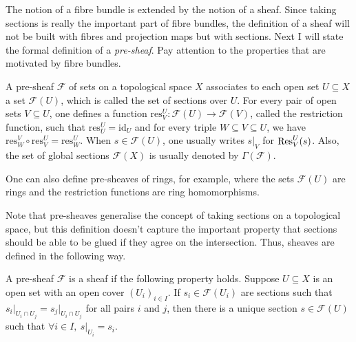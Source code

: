 The notion of a fibre bundle is extended by the notion of a sheaf.
Since taking sections is really the important part of fibre bundles, the
definition of a sheaf will not be built with fibres and projection maps
but with sections. Next I will state the formal definition of a
\emph{pre-sheaf}. Pay attention to the properties that are motivated by
fibre bundles.
\begin{defin}
  A pre-sheaf $\mathscr{F}$ of sets on a topological space $X$ associates
  to each open set $U\subseteq X$ a set $\mathscr{F}(U)$, which is called
  the set of sections over $U$. For every pair of open sets $V\subseteq U$,
  one defines a function $\text{res}_{V}^{U}:\mathscr{F}(U)\to\mathscr{F}(V)$,
  called the restriction function, such that $\text{res}_{U}^{U}
  =\text{id}_{U}$ and for every triple $W\subseteq V\subseteq U$, we have
  $\text{res}_{W}^{V}\circ\text{res}_{V}^{U}=\text{res}_{W}^{U}$.
  When $s\in\mathscr{F}(U)$, one usually writes $s\vert_{V}$ for
  $\operatorname{Res}_{V}^{U}(s)$. Also, the set of global sections $\mathscr{F}(X)$
  is usually denoted by $\Gamma(\mathscr{F})$.

  One can also define pre-sheaves of rings, for example, where the sets
  $\mathscr{F}(U)$ are rings and the restriction functions are
  ring homomorphisms.
\end{defin}
Note that pre-sheaves generalise the concept of taking sections on a
topological space, but this definition doesn't capture the important property
that sections should be able to be glued if they agree on the intersection.
Thus, sheaves are defined in the following way.
\begin{defin}
  A pre-sheaf $\mathscr{F}$ is a sheaf if the following property holds.
  Suppose $U\subseteq X$ is an open set with an open cover $(U_{i})_{i\in I}$.
  If $s_{i}\in\mathscr{F}(U_{i})$ are sections such that
  $s_{i}\vert_{U_{i}\cap U_{j}}=s_{j}\vert_{U_{i}\cap U_{j}}$ for all pairs $i$
  and $j$, then there is a unique section $s\in\mathscr{F}(U)$ such that
  $\forall i\in I,\ s\vert_{U_{i}}=s_{i}$.
\end{defin}
